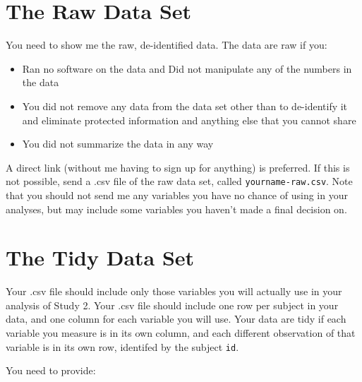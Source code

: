 \documentclass[]{book}
\providecommand{\tightlist}{%
  \setlength{\itemsep}{0pt}\setlength{\parskip}{0pt}}
\theoremstyle{definition}
\theoremstyle{definition}
\theoremstyle{definition}
\theoremstyle{remark}
\begin{document}
\hypertarget{the-raw-data-set-1}{%
\section{The Raw Data Set}\label{the-raw-data-set-1}}

You need to show me the raw, de-identified data. The data are raw if
you:

\begin{itemize}
\tightlist
\item
  Ran no software on the data and Did not manipulate any of the numbers
  in the data
\item
  You did not remove any data from the data set other than to
  de-identify it and eliminate protected information and anything else
  that you cannot share
\item
  You did not summarize the data in any way
\end{itemize}

A direct link (without me having to sign up for anything) is preferred.
If this is not possible, send a .csv file of the raw data set, called
\texttt{yourname-raw.csv}. Note that you should not send me any
variables you have no chance of using in your analyses, but may include
some variables you haven't made a final decision on.

\hypertarget{the-tidy-data-set-1}{%
\section{The Tidy Data Set}\label{the-tidy-data-set-1}}

Your .csv file should include only those variables you will actually use
in your analysis of Study 2. Your .csv file should include one row per
subject in your data, and one column for each variable you will use.
Your data are tidy if each variable you measure is in its own column,
and each different observation of that variable is in its own row,
identifed by the subject \texttt{id}.

You need to provide:
\end{document}
